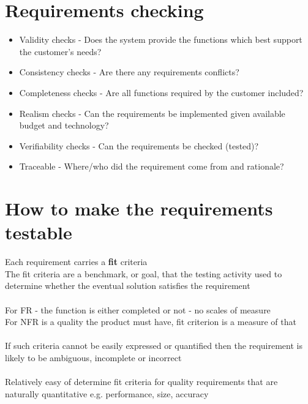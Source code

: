 \documentclass{article}[18pt]
\begin{document}
\section{Requirements checking}
\begin{itemize}
	\item Validity checks - Does the system provide the functions which best support the customer's needs?
	\item Consistency checks - Are there any requirements conflicts?
	\item Completeness checks - Are all functions required by the customer included?
	\item Realism checks - Can the requirements be implemented given available budget and technology?
	\item Verifiability checks - Can the requirements be checked (tested)?
	\item Traceable - Where/who did the requirement come from and rationale?
\end{itemize}
\section{How to make the requirements testable}
Each requirement carries a \textbf{fit} criteria\\
The fit criteria are a benchmark, or goal, that the testing activity used to determine whether the eventual solution satisfies the requirement\\
\\
For FR - the function is either completed or not - no scales of measure\\
For NFR is a quality the product must have, fit criterion is a measure of that\\
\\
If such criteria cannot be easily expressed or quantified then the requirement is likely to be ambiguous, incomplete or incorrect\\
\\
Relatively easy of determine fit criteria for quality requirements that are naturally quantitative e.g. performance, size, accuracy 
\end{document}
